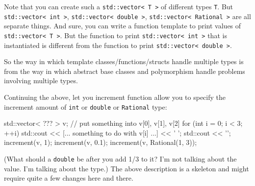 Note that you can create such a \verb!std::vector< T >! of different types \verb!T!. But \verb!std::vector< int >!, \verb!std::vector< double >!, \verb!std::vector< Rational >! are all separate things. And sure, you can write a function template to print values of \verb!std::vector< T >!. But the function to print \verb!std::vector< int >! that is instantiated is different from the function to print \verb!std::vector< double >!.

So the way in which template classes/functions/structs handle multiple
types is  from the way in which abstract base
classes and polymorphism handle problems involving multiple types.


\begin{ex} Continuing the above, let you increment function allow you to specify the increment amount of \verb!int! or \verb!double! or \verb!Rational! type:
\begin{console}
std::vector< ??? > v;
// put something into v[0], v[1], v[2]
for (int i = 0; i < 3; ++i)
{   
    std::cout << [... something to do with v[i] ...] << ' ';
}
std::cout << '\n';
increment(v, 1);
increment(v, 0.1);
increment(v, Rational(1, 3));
\end{console}

(What should a \verb!double! be after you add 1/3 to it? I'm not talking about the value. I'm talking about the type.) The above description is a skeleton and might require quite a few changes here and there.
\end{ex}

